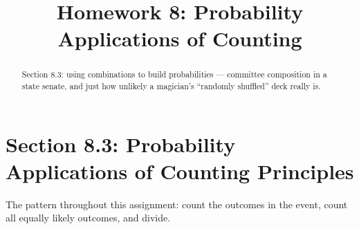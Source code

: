 \documentclass[12pt]{ximera}
\title{Homework 8: Probability Applications of Counting}
\begin{document}
\begin{abstract}
Section 8.3: using combinations to build probabilities --- committee composition in
a state senate, and just how unlikely a magician's ``randomly shuffled'' deck really
is.
\end{abstract}
\maketitle

\section*{Section 8.3: Probability Applications of Counting Principles}

The pattern throughout this assignment: count the outcomes in the event, count all
equally likely outcomes, and divide.
\end{document}
